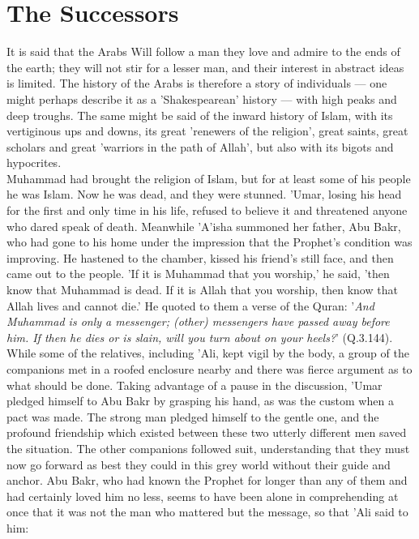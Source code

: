 \documentclass[11pt, b5paper, twoside]{book}
\begin{document}
\chapter{The Successors}

It is said that the Arabs Will follow a man they love and admire to the ends of the earth; they will not stir for a lesser man, and their interest in abstract ideas is limited. The history of the Arabs is therefore a story of individuals --- one might perhaps describe it as a 'Shakespearean' history --- with high peaks and deep troughs. The same might be said of the inward history of Islam, with its vertiginous ups and downs, its great 'renewers of the religion', great saints, great scholars and great 'warriors in the path of Allah', but also with its bigots and hypocrites. \\

Muhammad had brought the religion of Islam, but for at least some of his people he was Islam. Now he was dead, and they were stunned. 'Umar, losing his head for the first and only time in his life, refused to believe it and threatened anyone who dared speak of death. Meanwhile 'A'isha summoned her father, Abu Bakr, who had gone to his home under the impression that the Prophet's condition was improving. He hastened to the chamber, kissed his friend's still face, and then came out to the people. 'If it is Muhammad that you worship,' he said, 'then know that Muhammad is dead. If it is Allah that you worship, then know that Allah lives and cannot die.' He quoted to them a verse of the Quran: '\emph{And Muhammad is only a messenger; (other) messengers have passed away before him. If then he dies or is slain, will you turn about on your heels?}' (Q.3.144). \\

While some of the relatives, including 'Ali, kept vigil by the body, a group of the companions met in a roofed enclosure nearby and there was fierce argument as to what should be done. Taking advantage of a pause in the discussion, 'Umar pledged himself to Abu Bakr by grasping his hand, as was the custom when a pact was made. The strong man pledged himself to the gentle one, and the profound friendship which existed between these two utterly different men saved the situation. The other companions followed suit, understanding that they must now go forward as best they could in this grey world without their guide and anchor. Abu Bakr, who had known the Prophet for longer than any of them and had certainly loved him no less, seems to have been alone in comprehending at once that it was not the man who mattered but the message, so that 'Ali said to him: \\
\end{document}
